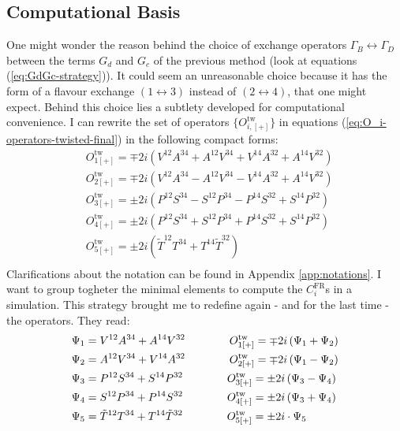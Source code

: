 \documentclass[english, LaM, oneside, noexaminfo]{sapthesis}
\begin{document}
\subsection{Computational Basis}
\noindent
One might wonder the reason behind the choice of exchange operators $\Gamma_B \leftrightarrow \Gamma_D$ between the terms $G_d$ and $G_c$ of the previous method (look at equations (\ref{eq:GdGc-strategy})).
It could seem an unreasonable choice because it has the form of a flavour exchange $(1\leftrightarrow 3)$ instead of $(2\leftrightarrow 4)$, that one might expect.
Behind this choice lies a subtlety developed for computational convenience.
\newline
I can rewrite the set of operators $\{O_{i,[+]}^\text{tw}\}$ in equations (\ref{eq:O_i-operators-twisted-final}) in the following compact forms:
\begin{equation}
    \begin{split}
        & O_{1[+]}^\text{tw} = \mp 2i \left( V^{12}A^{34} + A^{12}V^{34} + V^{14}A^{32} + A^{14}V^{32} \right) \\
        & O_{2[+]}^\text{tw} = \mp 2i \left( V^{12}A^{34} - A^{12}V^{34} - V^{14}A^{32} + A^{14}V^{32} \right) \\
        & O_{3[+]}^\text{tw} = \pm 2i \left( P^{12}S^{34} - S^{12}P^{34} - P^{14}S^{32} + S^{14}P^{32} \right) \\
        & O_{4[+]}^\text{tw} = \pm 2i \left( P^{12}S^{34} + S^{12}P^{34} + P^{14}S^{32} + S^{14}P^{32} \right) \\
        & O_{5[+]}^\text{tw} = \pm 2i \left( \tilde{T}^{12}T^{34} + T^{14}\tilde{T}^{32} \right) \\
    \end{split}
\end{equation}
Clarifications about the notation can be found in Appendix \ref{app:notations}.
I want to group togheter the minimal elements to compute the $C_i^\text{FR}$s in a simulation.
This strategy brought me to redefine again - and for the last time - the operators.
They read:
\begin{equation*}
    \begin{split}
        & \Psi_{1} =  V^{12}A^{34} + A^{14}V^{32} \hspace*{40pt} O_{1[+]}^\text{tw} = \mp 2i \left( \Psi_{1} + \Psi_{2} \right) \\
        & \Psi_{2} =  A^{12}V^{34} + V^{14}A^{32} \hspace*{40pt} O_{2[+]}^\text{tw} = \mp 2i \left( \Psi_{1} - \Psi_{2} \right) \\
        & \Psi_{3} =  P^{12}S^{34} + S^{14}P^{32} \hspace*{40pt} O_{3[+]}^\text{tw} = \pm 2i \left( \Psi_{3} - \Psi_{4} \right) \\
        & \Psi_{4} =  S^{12}P^{34} + P^{14}S^{32} \hspace*{40pt} O_{4[+]}^\text{tw} = \pm 2i \left( \Psi_{3} + \Psi_{4} \right) \\
        & \Psi_{5} =  \tilde{T}^{12}T^{34} + T^{14}\tilde{T}^{32} \hspace*{40pt} O_{5[+]}^\text{tw} = \pm 2i \cdot \Psi_{5} \\
    \end{split}
\end{equation*}
\end{document}
